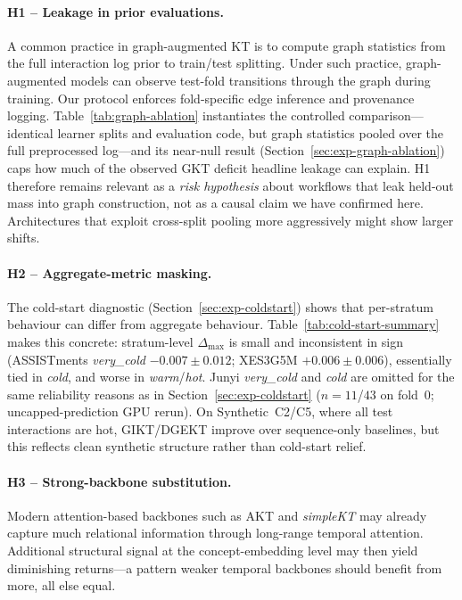 \documentclass[preprint,10pt,doubleblind]{elsarticle}
\begin{document}
\paragraph{H1 -- Leakage in prior evaluations.}
A common practice in graph-augmented KT is to compute graph statistics
from the full interaction log prior to train/test splitting. Under such
practice, graph-augmented models can observe test-fold transitions through
the graph during training. Our protocol enforces fold-specific edge
inference and provenance logging. Table~\ref{tab:graph-ablation}
instantiates the controlled comparison---identical learner splits and
evaluation code, but graph statistics pooled over the full preprocessed
log---and its near-null result
(Section~\ref{sec:exp-graph-ablation}) caps how much of the observed GKT
deficit headline leakage can explain. H1 therefore remains relevant as a
\emph{risk hypothesis} about workflows that leak held-out mass into graph
construction, not as a causal claim we have confirmed here. Architectures that
exploit cross-split pooling more aggressively might show larger shifts.

\paragraph{H2 -- Aggregate-metric masking.}
The cold-start diagnostic (Section~\ref{sec:exp-coldstart}) shows that
per-stratum behaviour can differ from aggregate behaviour.
Table~\ref{tab:cold-start-summary} makes this concrete: stratum-level
$\Delta_{\max}$ is small and inconsistent in sign (ASSISTments
\emph{very\_cold} $-0.007{\pm}0.012$; XES3G5M $+0.006{\pm}0.006$),
essentially tied in \emph{cold}, and worse in \emph{warm}/\emph{hot}.
Junyi \emph{very\_cold} and \emph{cold} are omitted for the same reliability
reasons as in Section~\ref{sec:exp-coldstart} ($n{=}11$/$43$ on fold~0;
uncapped-prediction GPU rerun). On
Synthetic~C2/C5, where all test interactions are hot, GIKT/DGEKT improve over
sequence-only baselines, but this reflects clean synthetic structure rather
than cold-start relief.

\paragraph{H3 -- Strong-backbone substitution.}
Modern attention-based backbones such as AKT and \textit{simpleKT} may
already capture much relational information through long-range temporal
attention. Additional structural signal at the concept-embedding level may
then yield diminishing returns---a pattern weaker temporal backbones should
benefit from more, all else equal.
\end{document}
